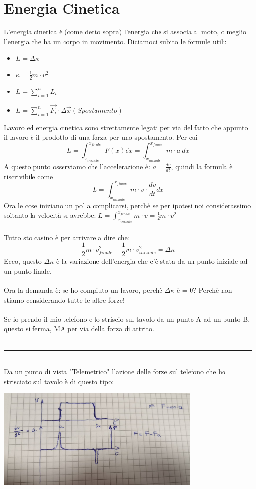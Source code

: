 \documentclass[12pt, a4paper, openany, oneside]{book}
\begin{document}
\section{Energia Cinetica}
L'energia cinetica è (come detto sopra) l'energia che si associa al moto, o 
meglio l'energia che ha un corpo in movimento. Diciamoci subito le formule utili:
\begin{itemize}
	\item $L = \Delta \kappa$
	\item $\kappa = \frac{1}{2}m\cdot v^{2}$
	\item $L = \sum_{i=1}^{n} L_{i}$
	\item $L = \sum_{i=1}^{n} \overrightarrow{F_{i}} \cdot \Delta
	\overrightarrow{x} (Spostamento)$
\end{itemize}
Lavoro ed energia cinetica sono strettamente legati per via del fatto che 
appunto il lavoro è il prodotto di una forza per uno spostamento. Per cui \\
\[
L = \int_{x_{iniziale}}^{x_{finale}} F(x) dx = 
\int_{x_{iniziale}}^{x_{finale}} m\cdot a ~ dx
\]
A questo punto osserviamo che l'accelerazione è: $a = \frac{dv}{dt}$, quindi 
la formula è riscrivibile come \[L = \int_{x_{iniziale}}^{x_{finale}} m\cdot v 
\cdot \frac{dv}{dt} dx\] 
Ora le cose iniziano un po' a complicarsi, perchè se per ipotesi noi considerassimo
soltanto la velocità si avrebbe: $L = \int_{x_{iniziale}}^{x_{finale}} m\cdot v 
= \frac{1}{2}m\cdot v^{2}$\\ \\
Tutto sto casino è per arrivare a dire che: 
\[\frac{1}{2}m\cdot v_{finale}^{2} - \frac{1}{2}m\cdot v_{iniziale}^{2} = 
\Delta\kappa\]
Ecco, questo $\Delta\kappa$ è la variazione dell'energia che c'è stata da un 
punto iniziale ad un punto finale. \\ \\
Ora la domanda è: se ho compiuto un lavoro, perchè $\Delta\kappa$ è = 0? Perchè
non stiamo considerando tutte le altre forze! \\
\\Se io prendo il mio telefono e lo
striscio sul tavolo da un punto A ad un punto B, questo si ferma, MA per via
della forza di attrito. \\ 
\\
{\color{black} \rule{\linewidth}{0.3mm}}
\\
Da un punto di vista "Telemetrico" l'azione delle forze sul telefono che ho 
strisciato sul tavolo è di questo tipo:
\begin{center}
\includegraphics[width=0.75\textwidth]{telefonoStriscia}
\end{center}
\end{document}
